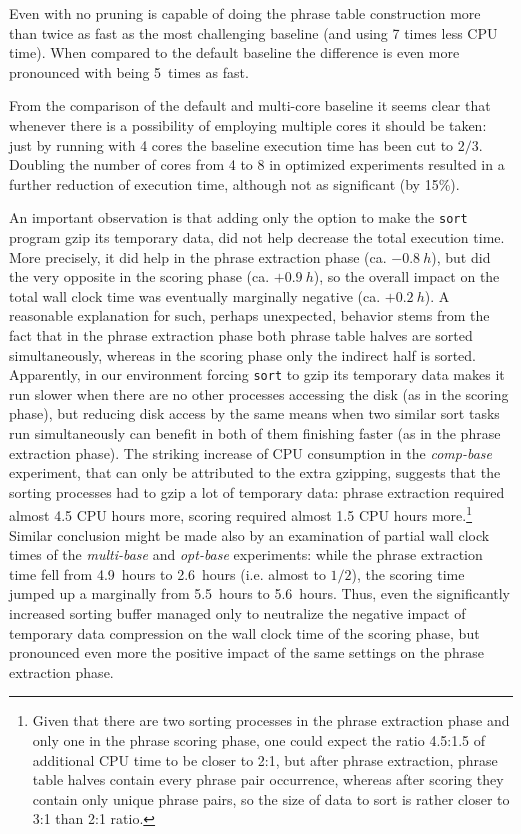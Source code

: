 Even with no pruning \eppex{} is capable of doing the phrase table construction more
than twice as fast as the most challenging baseline (and using 7 times less CPU time).
When compared to the default baseline the difference is even more pronounced with \eppex{}
being 5~times as fast.

From the comparison of the default and multi-core baseline it seems clear that whenever there
is a possibility of employing multiple cores it should be taken: just by running with 4 cores
the baseline execution time has been cut to $2/3$.
Doubling the number of cores from 4 to 8 in optimized experiments resulted in a further reduction
of execution time, although not as significant (by 15\%).

An important observation is that adding only the option to make the \texttt{sort} program gzip
its temporary data, did not help decrease the total execution time.
More precisely, it did help in the phrase extraction phase (ca. $-0.8~h$), but did the very opposite
in the scoring phase (ca. $+0.9~h$), so the overall impact on the total wall clock time was eventually
marginally negative (ca. $+0.2~h$).
A reasonable explanation for such, perhaps unexpected, behavior stems from the fact that in the phrase
extraction phase both phrase table halves are sorted simultaneously, whereas in the scoring phase
only the indirect half is sorted.
Apparently, in our environment forcing \texttt{sort} to gzip its temporary data makes it run
slower when there are no other processes accessing the disk (as in the scoring phase), but reducing
disk access by the same means when two similar sort tasks run simultaneously can benefit
in both of them finishing faster (as in the phrase extraction phase).
The striking increase of CPU consumption in the \emph{comp-base} experiment, that can only be
attributed to the extra gzipping, suggests that the sorting processes had to gzip a lot of
temporary data:
phrase extraction required almost 4.5 CPU hours more, scoring required almost 1.5 CPU hours
more.\footnote{Given that there are two sorting processes in the phrase extraction phase and
only one in the phrase scoring phase, one could expect the ratio
4.5:1.5 of additional CPU time to be closer to 2:1, but after phrase extraction, phrase table halves
contain every phrase pair occurrence, whereas after scoring they contain only unique phrase pairs,
so the size of data to sort is rather closer to 3:1 than 2:1 ratio.}
Similar conclusion might be made also by an examination of partial wall clock times of the \emph{multi-base}
and \emph{opt-base} experiments: while the phrase extraction time fell from 4.9~hours to 2.6~hours
(i.e. almost to $1/2$), the scoring time jumped up a marginally from 5.5~hours to 5.6~hours.
Thus, even the significantly increased sorting buffer managed only to neutralize the negative impact of
temporary data compression on the wall clock time of the scoring phase, but pronounced even more
the positive impact of the same settings on the phrase extraction phase.

